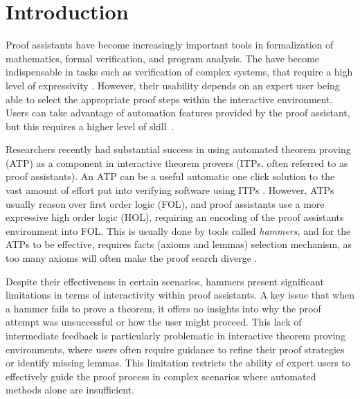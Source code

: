 \section{Introduction}

Proof assistants have become increasingly important tools in formalization of mathematics, formal verification, and program analysis. 
The have become indispensable in tasks such as verification of complex systems, that require a high level of expressivity \cite{bedrock, compcert}.
However, their usability depends on an expert user being able to select the appropriate proof steps within the interactive environment.
Users can take advantage of automation features provided by the proof assistant, but this requires a higher level of skill~\cite{qedatlarge}.

Researchers recently had substantial success in using automated theorem proving (ATP) as a component in interactive theorem provers (ITPs, often referred to as proof assistants).
An ATP can be a useful automatic one click solution to the vast amount of effort put into verifying software using ITPs \cite{qedatlarge,compcert,bedrock}.
However, ATPs usually reason over first order logic (FOL), and proof assistants use a more expressive high order logic (HOL), requiring an encoding of the proof assistants environment into FOL.
This is usually done by tools called \emph{hammers}, and for the ATPs to be effective, requires facts (axioms and lemmas) selection mechanism, as too many axioms will often make the proof search diverge \cite{coqhammer, hammeringqed, sledgehammer}.

Despite their effectiveness in certain scenarios, hammers present significant limitations in terms of interactivity within proof assistants.
A key issue that when a hammer fails to prove a theorem, it offers no insights into why the proof attempt was unsuccessful or how the user might proceed. 
This lack of intermediate feedback is particularly problematic in interactive theorem proving environments, where users often require guidance to refine their proof strategies or identify missing lemmas.
This limitation restricts the ability of expert users to effectively guide the proof process in complex scenarios where automated methods alone are insufficient.

\begin{comment}
This chapter introduces an approach dubbed Lightweight Equality Saturation (LES) for proof assistants, which aims to apply equality saturation to a reduced form of the available theory, thus maintaining computational efficiency required for an interactive setting.
By selectively applying saturation techniques to critical subterms and leveraging domain-specific heuristics, LES offers a promising framework for enhancing the capabilities of proof assistants without incurring prohibitive performance costs.
\end{comment}

